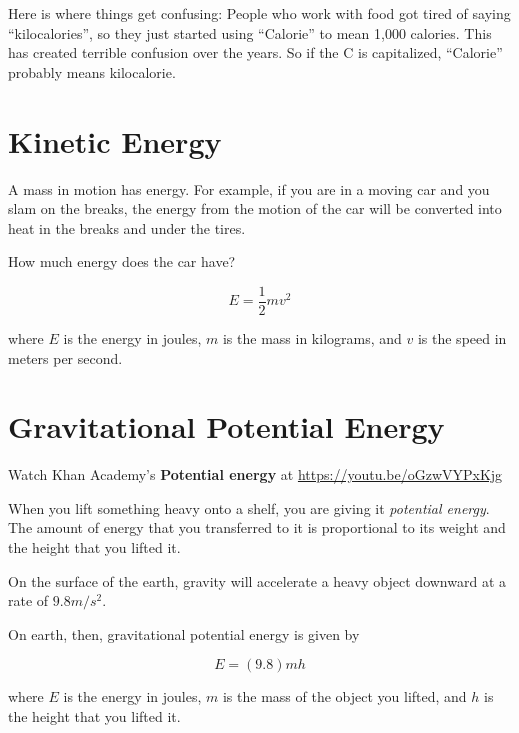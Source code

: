 Here is where things get confusing: People who work with food got tired of
saying ``kilocalories'', so they just started using ``Calorie'' to
mean 1,000 calories.  This has created terrible confusion over the
years. So if the C is capitalized, ``Calorie'' probably means kilocalorie.

\section{Kinetic Energy}

A mass in motion has energy. For example, if you are in a moving car
and you slam on the breaks, the energy from the motion of the
car will be converted into heat in the breaks and under the tires.

How much energy does the car have?

\begin{mdframed}[style=important, frametitle={Formula for Kinetic Energy}]

$$E = \frac{1}{2} m v^2$$

where $E$ is the energy in joules, $m$ is the mass in kilograms, and
$v$ is the speed in meters per second.

\end{mdframed}

\section{Gravitational Potential Energy}

Watch Khan Academy's \textbf{Potential energy} at \url{https://youtu.be/oGzwVYPxKjg}

When you lift something heavy onto a shelf, you are giving it
\textit{potential energy}. The amount of energy that you transferred
to it is proportional to its weight and the height that you lifted it.

On the surface of the earth, gravity will accelerate a heavy object downward at
a rate of $9.8 m/s^2$.

\begin{mdframed}[style=important, frametitle={Formula for Gravitational Potential Energy}]
On earth, then, gravitational potential energy is given by

$$E = (9.8)mh$$


where $E$ is the energy in joules, $m$ is the mass of the object you
lifted, and $h$ is the height that you lifted it.

\end{mdframed}


